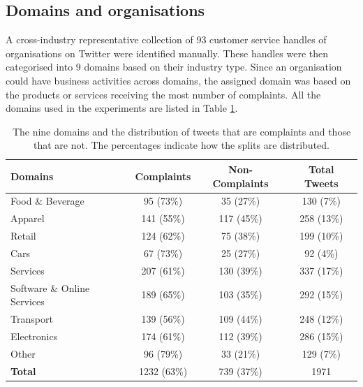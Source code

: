 \subsection{Domains and organisations}
A cross-industry representative collection of 93 customer service handles of organisations on Twitter were identified manually. These handles were then categorised into 9 domains based on their industry type. Since an organisation could have business activities across domains, the assigned domain was based on the products or services receiving the most number of complaints. All the domains used in the experiments are listed in Table \ref{tab: domains}. 
\begin{table}[ht]
    \captionsetup{font=small}
    \centering
    \begin{tabularx}{\textwidth}{|X|c|c|c|}
    \hline
    \rowcolor[gray]{0.7}
    \textbf{Domains} & \textbf{Complaints} & \textbf{Non-Complaints} & \textbf{Total Tweets}\\
    \hline
    Food \& Beverage & 95 \small{(73\%)} & 35 \small{(27\%)} & 130 \small{(7\%)}\\
    \rowcolor[gray]{0.9}
    Apparel & 141 \small{(55\%)} & 117 \small{(45\%)} & 258 \small{(13\%)}\\
    Retail & 124 \small{(62\%)}& 75 \small{(38\%)} & 199 \small{(10\%)}\\
    \rowcolor[gray]{0.9}
    Cars & 67 \small{(73\%)} & 25 \small{(27\%)}  & 92 \small{(4\%)} \\
    Services  & 207 \small{(61\%)} & 130 \small{(39\%)}  & 337 \small{(17\%)} \\
    \rowcolor[gray]{0.9}
    Software \& Online Services & 189 \small{(65\%)} & 103 \small{(35\%)}  & 292 \small{(15\%)} \\
    Transport & 139 \small{(56\%)} & 109 \small{(44\%)}  & 248 \small{(12\%)} \\
    \rowcolor[gray]{0.9}
    Electronics & 174 \small{(61\%)} & 112 \small{(39\%)}  & 286 \small{(15\%)} \\
    Other & 96 \small{(79\%)} & 33 \small{(21\%)}  & 129 \small{(7\%)} \\
    \hline
    \rowcolor[gray]{0.9}
    \textbf{Total} & 1232 \small{(63\%)} & 739 \small{(37\%)}& 1971\\
    \hline
    \end{tabularx}
    \caption{The nine domains and the distribution of tweets that are complaints and those that are not. The percentages indicate how the splits are distributed.}    
    \label{tab: domains}
\end{table}  

